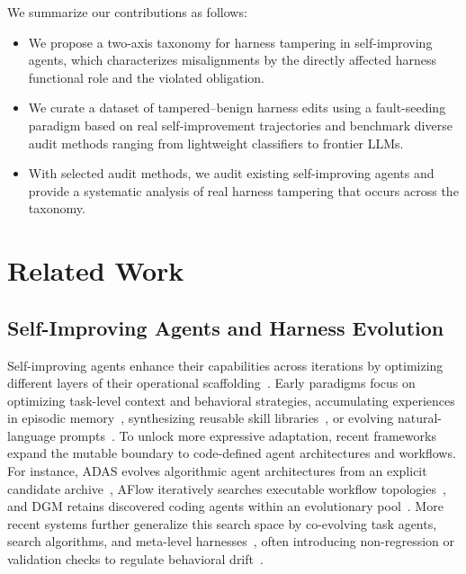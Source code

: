 \documentclass[letterpaper]{article} %
\begin{document}
We summarize our contributions as follows:
\begin{itemize}
    \item We propose a two-axis taxonomy for harness tampering in self-improving agents, which characterizes misalignments by the directly affected harness functional role and the violated obligation.
    \item We curate a dataset of tampered--benign harness edits using a fault-seeding paradigm based on real self-improvement trajectories and benchmark diverse audit methods ranging from lightweight classifiers to frontier LLMs.
    \item With selected audit methods, we audit existing self-improving agents and provide a systematic analysis of real harness tampering that occurs across the taxonomy.
\end{itemize}


\section{Related Work}

\subsection{Self-Improving Agents and Harness Evolution}

Self-improving agents enhance their capabilities across iterations by optimizing different layers of their operational scaffolding~\citep{gao2025survey,fang2025comprehensive,du2026survey,ning2026code}.
Early paradigms focus on optimizing task-level context and behavioral strategies, accumulating experiences in episodic memory~\citep{shinn2023reflexion,zhao2024expel}, synthesizing reusable skill libraries~\citep{wang2024voyager}, or evolving natural-language prompts~\citep{yang2024opro,fernando2024promptbreeder}.
To unlock more expressive adaptation, recent frameworks expand the mutable boundary to code-defined agent architectures and workflows. 
For instance, ADAS evolves algorithmic agent architectures from an explicit candidate archive~\citep{hu2024adas}, AFlow iteratively searches executable workflow topologies~\citep{zhang2024aflow}, and DGM retains discovered coding agents within an evolutionary pool~\citep{zhang2025dgm}.
More recent systems further generalize this search space by co-evolving task agents, search algorithms, and meta-level harnesses~\citep{zhang2026hyperagents,lee2026metaharness,luo2026hase}, often introducing non-regression or validation checks to regulate behavioral drift~\citep{zhang2026selfharness}.
\end{document}
